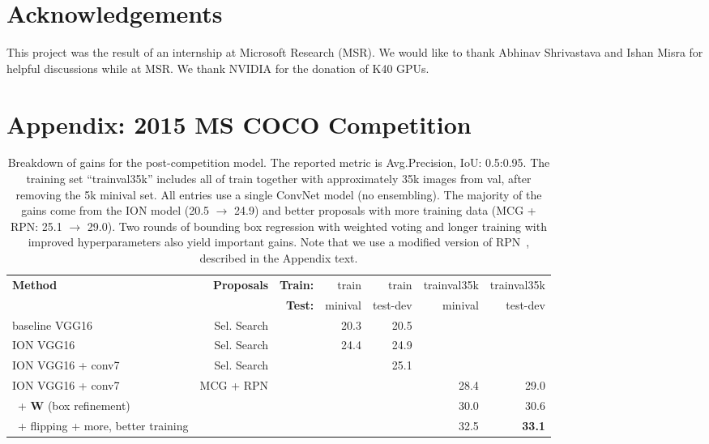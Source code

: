 \documentclass[10pt,twocolumn,letterpaper]{article}
\begin{document}
\section*{Acknowledgements}
This project was the result of an internship at Microsoft Research (MSR).  We
would like to thank Abhinav Shrivastava and Ishan Misra for helpful discussions
while at MSR.  We thank NVIDIA for the donation of K40 GPUs.


%

%

{\small


}

\vfill\newpage\section*{Appendix: 2015 MS COCO Competition}\begin{table*}[t]
  \centering
  \small{\begin{tabular}{%
  lrrrrrr}
  \toprule
  \multirow{2}{*}{\textbf{Method}} &
  \multirow{2}{*}{\textbf{Proposals}} &
  \textbf{Train:} &
  train & train &
  trainval35k &
  trainval35k \\
  & &
  \textbf{Test:} &
  minival &
  test-dev &
  minival &
  test-dev \\
  \midrule
%
  baseline VGG16 & Sel. Search & & 20.3 & 20.5 & & \\
%
  ION VGG16 & Sel. Search & & 24.4 & 24.9 & & \\
%
  ION VGG16 + conv7& Sel. Search & & & 25.1 & & \\
%
  ION VGG16 + conv7& MCG + RPN & & & & 28.4 & 29.0 \\
  ~+ \textbf{W} (box refinement) & & & & & 30.0 & 30.6 \\
  ~+ flipping + more, better training & & & & & 32.5 & \textbf{33.1} \\
  \bottomrule
\end{tabular}
  \vspace{3pt}
  \caption{%
    Breakdown of gains for the post-competition model. The reported metric is
    Avg.\@ Precision, IoU: 0.5:0.95. The training set ``trainval35k'' includes all
    of train together with approximately 35k images from val, after removing the
    5k minival set.  All entries use a single ConvNet model (no ensembling).
    The majority of the gains come from the ION model (20.5 $\rightarrow$ 24.9)
    and better proposals with more training data (MCG + RPN: 25.1 $\rightarrow$ 29.0).
    Two rounds of bounding box regression with weighted voting and longer
    training with improved hyperparameters also yield important gains.  Note
    that we use a modified version of RPN~\cite{ren2015faster}, described in the
    Appendix text.
  }
  \label{tab:coco-breakdown}
}
\end{table*}
\end{document}
